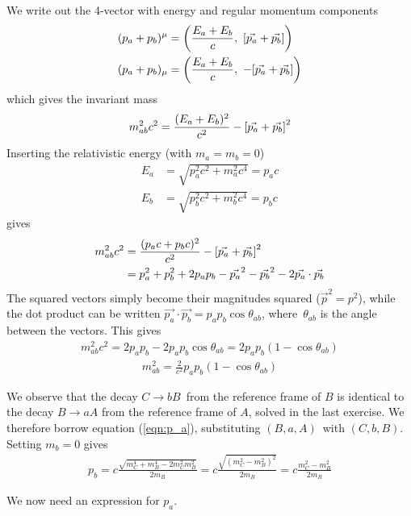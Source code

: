 \documentclass[12p,a4paper]{article}
\begin{document}
We write out the 4-vector with energy and regular momentum components
\begin{align*}
    (p_a + p_b)^\mu &= \qty(\frac{E_a + E_b}{c},\ \qty[\vec{p_a} + \vec{p_b}])\\
    (p_a + p_b)_\mu &= \qty(\frac{E_a + E_b}{c},\ -\qty[\vec{p_a} + \vec{p_b}])
\end{align*}
which gives the invariant mass
\begin{align*}
    m_{ab}^2c^2 = \frac{(E_a + E_b)^2}{c^2} - \qty[\vec{p_a} + \vec{p_b}]^2
\end{align*}
Inserting the relativistic energy (with $m_a = m_b = 0$)
\begin{align*}
    E_a &= \sqrt{p_a^2c^2 + m_a^2c^4} = p_ac \\
    E_b &= \sqrt{p_b^2c^2 + m_b^2c^4} = p_bc
\end{align*}
gives
\begin{align*}
    m_{ab}^2c^2 &= \frac{(p_ac + p_bc)^2}{c^2} - \qty[\vec{p_a} + \vec{p_b}]^2 \\
    &= p_a^2 + p_b^2 + 2p_ap_b - \vec{p_a}^2 - \vec{p_b}^2 - 2\vec{p_a}\cdot\vec{p_b}
\end{align*}
The squared vectors simply become their magnitudes squared ($\vec{p}^2 = p^2$), while the dot product can be written $\vec{p_a}\cdot\vec{p_b} = p_ap_b\cos{\theta_{ab}}$, where $\theta_{ab}$ is the angle between the vectors. This gives
\begin{align*}
    m_{ab}^2c^2 = 2p_ap_b - 2p_ap_b\cos{\theta_{ab}} = 2p_ap_b(1-\cos{\theta_{ab}})
\end{align*}
\begin{align}\label{eqn:m_ab}
    m_{ab}^2 = \frac{2}{c^2}p_ap_b(1-\cos{\theta_{ab}})
\end{align}

We observe that the decay $C \rightarrow bB$ from the reference frame of $B$ is identical to the decay $B \rightarrow aA$ from the reference frame of $A$, solved in the last exercise. We therefore borrow equation (\ref{eqn:p_a}), substituting $(B, a, A)$ with $(C, b, B)$. Setting $m_b = 0$ gives
\begin{align}
    p_b = c\frac{\sqrt{m_C^4 + m_B^4 - 2m_C^2m_B^2}}{2m_B} = c\frac{\sqrt{(m_C^2 - m_B^2)^2}}{2m_B} = c\frac{m_C^2 - m_B^2}{2m_B}
\end{align}

We now need an expression for $p_a$.
\end{document}
